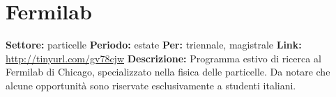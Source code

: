 \documentclass[a4paper,10pt]{article}
\begin{document}
\section{Fermilab}

\textbf{Settore:} particelle \newline
\textbf{Periodo:} estate \newline
\textbf{Per:} triennale, magistrale \newline
\textbf{Link:} \url{http://tinyurl.com/gv78cjw} \newline
\textbf{Descrizione:} Programma estivo di ricerca al Fermilab di Chicago, specializzato nella fisica delle particelle. Da notare che alcune opportunità sono riservate esclusivamente a studenti italiani.	




\end{document}
